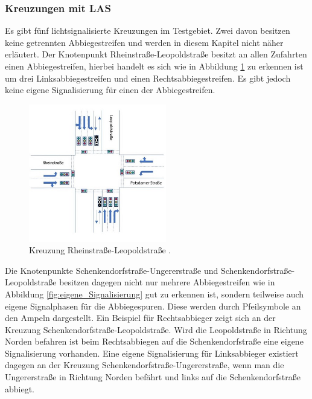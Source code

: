 \subsubsection{Kreuzungen mit LAS}
Es gibt fünf lichtsignalisierte Kreuzungen im Testgebiet. Zwei davon besitzen keine getrennten Abbiegestreifen und werden in diesem Kapitel nicht näher erläutert. Der Knotenpunkt Rheinstraße-Leopoldstraße besitzt an allen Zufahrten einen Abbiegestreifen, hierbei handelt es sich wie in Abbildung \ref{fig:Rhein_Leo} zu erkennen ist um drei Linksabbiegestreifen und einen Rechtsabbiegestreifen. Es gibt jedoch keine eigene Signalisierung für einen der Abbiegestreifen. 

\begin{savenotes}
	\begin{figure}[H]
		\centering
		\includegraphics[width=6cm,height=6cm]{figures/Rhein_Leo}
		\caption[Kreuzung Rheinstraße-Leopoldstraße]{Kreuzung Rheinstraße-Leopoldstraße \parencite[S.28]{Kutsch.05.04.2018}.}\label{fig:Rhein_Leo}
	\end{figure}
\end{savenotes}

Die Knotenpunkte Schenkendorfstraße-Ungererstraße und Schenkendorfstraße-Leopoldstraße besitzen dagegen nicht nur mehrere Abbiegestreifen wie in Abbildung \ref{fig:eigene_Signalisierung}
gut zu erkennen ist, sondern teilweise auch eigene Signalphasen für die Abbiegespuren. Diese werden durch Pfeilsymbole an den Ampeln dargestellt. Ein Beispiel für Rechtsabbieger zeigt sich an der Kreuzung Schenkendorfstraße-Leopoldstraße. Wird die Leopoldstraße in Richtung Norden befahren ist beim Rechtsabbiegen auf die Schenkendorfstraße eine eigene Signalisierung vorhanden. Eine eigene Signalisierung für Linksabbieger existiert dagegen an der Kreuzung Schenkendorfstraße-Ungererstraße, wenn man die Ungererstraße in Richtung Norden befährt und links auf die Schenkendorfstraße abbiegt.

